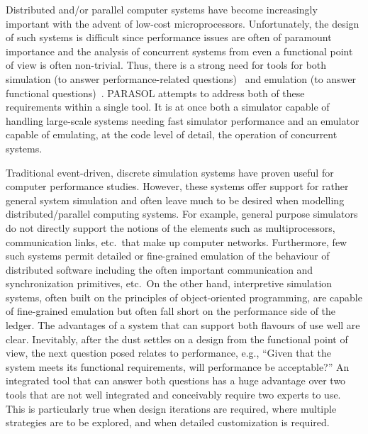 \documentclass[11pt]{article}
\begin{document}
Distributed and/or parallel computer systems have become increasingly important with the advent
of low-cost microprocessors.  Unfortunately, the design of such systems is difficult since
performance issues are often of paramount importance and the analysis of concurrent systems from
even a functional point of view is often non-trivial. Thus, there is a strong need for tools for both
simulation (to answer performance-related questions)~\cite{davis-tango} and emulation (to answer functional
questions)~\cite{karam-mlog}. PARASOL attempts to address both of these requirements within a single tool. It
is at once both a simulator capable of handling large-scale systems needing fast simulator
performance and an emulator capable of emulating, at the code level of detail, the operation of
concurrent systems.

Traditional event-driven, discrete simulation systems have proven useful for computer performance
studies. However, these systems offer support for rather general system simulation and often
leave much to be desired when modelling distributed/parallel computing systems. For example,
general purpose simulators do not directly support the notions of the elements such as
multiprocessors, communication links, etc.\ that make up computer networks. Furthermore, few 
such systems permit detailed or fine-grained emulation of the behaviour of distributed software
including the often important communication and synchronization primitives, etc.\ On the other 
hand, interpretive simulation systems, often built on the principles of object-oriented
programming, are capable of fine-grained emulation but often fall short on the performance side of
the ledger. The advantages of a system that can support both flavours of use well are clear.
Inevitably, after the dust settles on a design from the functional point of view, the next question
posed relates to performance, e.g., ``Given that the system meets its functional requirements, will
performance be acceptable?''  An integrated tool that can answer both questions has a huge
advantage over two tools that are not well integrated and conceivably require two experts to
use. This is particularly true when design iterations are required, where multiple strategies are to be
explored, and when detailed customization is required.
\end{document}
